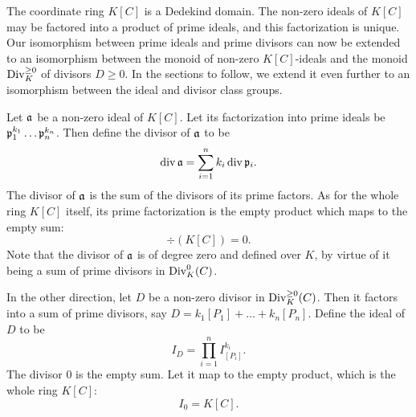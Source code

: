 The coordinate ring $K[C]$ is a Dedekind domain.
The non-zero ideals of $K[C]$ may be factored into a product of prime ideals, and this factorization is unique.
Our isomorphism between prime ideals and prime divisors can now be extended
to an isomorphism between the monoid of non-zero $K[C]$-ideals
and the monoid $\Div_K^{\geq 0}$ of divisors $D \geq 0$.
In the sections to follow, we extend it even further
to an isomorphism between the ideal and divisor class groups.

Let $\frak a$ be a non-zero ideal of $K[C]$.
Let its factorization into prime ideals be $\frak p_1^{k_1} \dots \frak p_n^{k_n}$.
Then define the divisor of $\frak a$ to be
\[ \div \frak a = \sum_{i=1}^n k_i \div \frak p_i. \]
The divisor of $\frak a$ is the sum of the divisors of its prime factors.
As for the whole ring $K[C]$ itself,
its prime factorization is the empty product which maps to the empty sum:
  \[ \div (K[C]) = 0. \]
Note that the divisor of $\frak a$ is of degree zero and defined over $K$,
by virtue of it being a sum of prime divisors in $\Div_K^0(C)$.

In the other direction, let $D$ be a non-zero divisor in $\Div_K^{\geq 0}(C)$.
Then it factors into a sum of prime divisors, say $D = k_1[P_1] + \dots + k_n[P_n]$.
Define the ideal of $D$ to be
\[ I_D = \prod_{i=1}^n I_{[P_i]}^{k_i}. \]
The divisor 0 is the empty sum.
Let it map to the empty product, which is the whole ring $K[C]$:
\[ I_{0} = K[C]. \]

